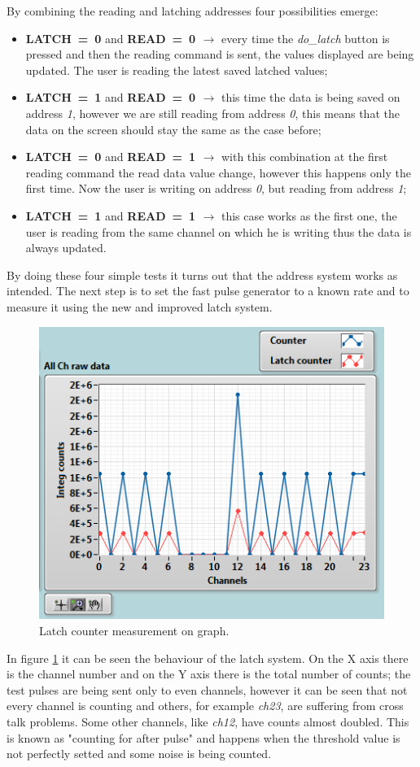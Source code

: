 By combining the reading and latching addresses four possibilities emerge:
\begin{itemize}
	\item \textbf{LATCH~=~0} and \textbf{READ~=~0 $\rightarrow$} every time the \textit{do\_latch} button is pressed and then the reading command is sent, the values displayed are being updated. The user is reading the latest saved latched values;
	\item \textbf{LATCH~=~1} and \textbf{READ~=~0 $\rightarrow$} this time the data is being saved on address \textit{1}, however we are still reading from address \textit{0}, this means that the data on the screen should stay the same as the case before;
	\item \textbf{LATCH~=~0} and \textbf{READ~=~1 $\rightarrow$} with this combination at the first reading command the read data value change, however this happens only the first time. Now the user is writing on address \textit{0}, but reading from address \textit{1};
	\item \textbf{LATCH~=~1} and \textbf{READ~=~1 $\rightarrow$} this case works as the first one, the user is reading from the same channel on which he is writing thus the data is always updated. 
\end{itemize}
\noindent By doing these four simple tests it turns out that the address system works as intended. The next step is to set the fast pulse generator to a known rate and to measure it using the new and improved latch system.
\begin{figure}[H]
	\centering
	\includegraphics[width=0.5\linewidth]{IMG/ch5/latch_tests/fig2.PNG}
	\caption{Latch counter measurement on graph.}
	\label{fig:latchfigure}
\end{figure}
\noindent In figure \ref{fig:latchfigure} it can be seen the behaviour of the latch system. On the X axis there is the channel number and on the Y axis there is the total number of counts; the test pulses are being sent only to even channels, however it can be seen that not every channel is counting and others, for example \textit{ch23}, are suffering from cross talk problems. Some other channels, like \textit{ch12}, have counts almost doubled. This is known as "counting for after pulse" and happens when the threshold value is not perfectly setted and some noise is being counted.
